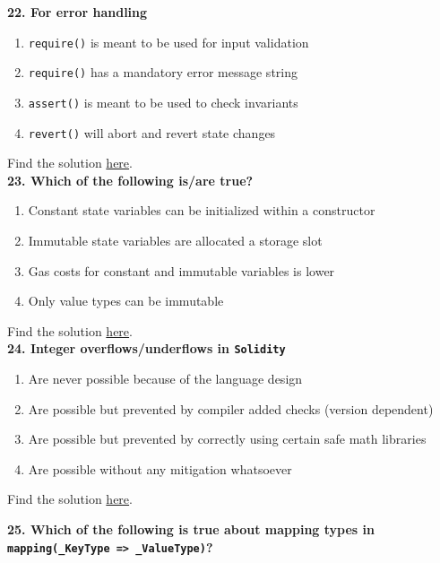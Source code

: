 \textbf{22. For error handling}

\begin{enumerate}[label=\Alph*.]
    \item\verb|require()| is meant to be used for input validation
    \item\verb|require()| has a mandatory error message string
    \item\verb|assert()| is meant to be used to check invariants
    \item\verb|revert()| will abort and revert state changes
\end{enumerate}

Find the solution \hyperref[sec:exam2_q22]{here}.\\

\textbf{23. Which of the following is/are true?}

\begin{enumerate}[label=\Alph*.]
    \item Constant state variables can be initialized within a constructor
    \item Immutable state variables are allocated a storage slot
    \item Gas costs for constant and immutable variables is lower
    \item Only value types can be immutable
\end{enumerate}

Find the solution \hyperref[sec:exam2_q23]{here}.\\

\textbf{24. Integer overflows/underflows in \texttt{Solidity}}

\begin{enumerate}[label=\Alph*.]
    \item Are never possible because of the language design
    \item Are possible but prevented by compiler added checks (version dependent)
    \item Are possible but prevented by correctly using certain safe math libraries
    \item Are possible without any mitigation whatsoever
\end{enumerate}

Find the solution \hyperref[sec:exam2_q24]{here}.\\

\pagebreak

\textbf{25. Which of the following is true about mapping types in \texttt{mapping(\_KeyType => \_ValueType)}?}

